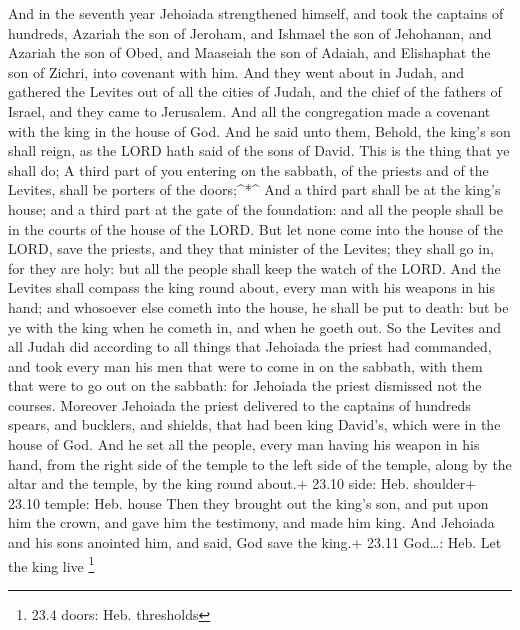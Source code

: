  And in the seventh year Jehoiada strengthened himself, and
took the captains of hundreds, Azariah the son of Jeroham, and Ishmael
the son of Jehohanan, and Azariah the son of Obed, and Maaseiah the son
of Adaiah, and Elishaphat the son of Zichri, into covenant with him.
 And they went about in Judah, and gathered the Levites out
of all the cities of Judah, and the chief of the fathers of Israel, and
they came to Jerusalem.  And all the congregation made a
covenant with the king in the house of God. And he said unto them,
Behold, the king's son shall reign, as the LORD hath said of the sons of
David.  This is the thing that ye shall do; A third part of
you entering on the sabbath, of the priests and of the Levites, shall be
porters of the doors;\^{}*\^{}  And a third part shall be at
the king's house; and a third part at the gate of the foundation: and
all the people shall be in the courts of the house of the LORD.
 But let none come into the house of the LORD, save the
priests, and they that minister of the Levites; they shall go in, for
they are holy: but all the people shall keep the watch of the LORD.
 And the Levites shall compass the king round about, every
man with his weapons in his hand; and whosoever else cometh into the
house, he shall be put to death: but be ye with the king when he cometh
in, and when he goeth out.  So the Levites and all Judah did
according to all things that Jehoiada the priest had commanded, and took
every man his men that were to come in on the sabbath, with them that
were to go out on the sabbath: for Jehoiada the priest dismissed not the
courses.  Moreover Jehoiada the priest delivered to the
captains of hundreds spears, and bucklers, and shields, that had been
king David's, which were in the house of God.  And he set
all the people, every man having his weapon in his hand, from the right
side of the temple to the left side of the temple, along by the altar
and the temple, by the king round about.+ 23.10 side: Heb. shoulder+
23.10 temple: Heb. house  Then they brought out the king's
son, and put upon him the crown, and gave him the testimony, and made
him king. And Jehoiada and his sons anointed him, and said, God save the
king.+ 23.11 God\ldots: Heb. Let the king live \footnote{23.4 doors:
  Heb. thresholds}

